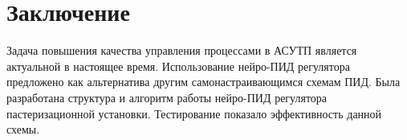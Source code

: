 \chapter*{Заключение}

Задача повышения качества управления процессами в АСУТП является актуальной в настоящее время. Использование нейро-ПИД регулятора предложено как альтернатива другим самонастраивающимся схемам ПИД. Была разработана структура и алгоритм работы нейро-ПИД регулятора пастеризационной установки. Тестирование показало эффективность данной схемы.
